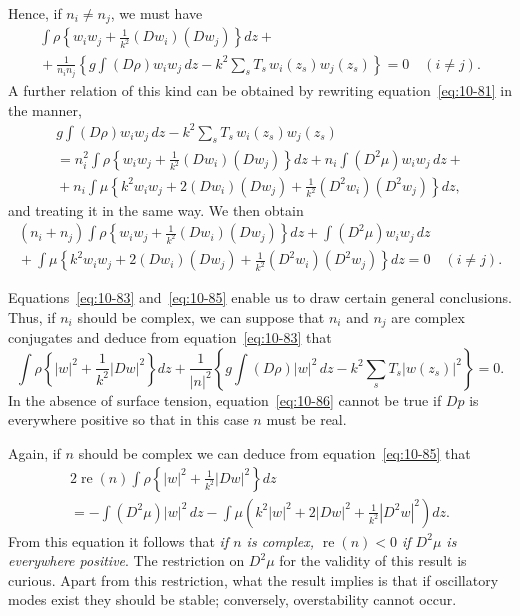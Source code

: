 Hence, if $n_i \neq n_j$, we must have
\begin{align}
\label{eq:10-83}
\int\rho\!\left\{w_iw_j+\frac{1}{k^2}(Dw_i)(Dw_j)\right\}\!dz + {} \nonumber\\
{} + \frac{1}{n_in_j}\!\left\{g\int(D\rho)w_iw_j\,dz - k^2\sum_s T_s\,w_i(z_s)w_j(z_s)\right\} = 0 \quad (i\neq j).
\end{align}
A further relation of this kind can be obtained by rewriting equation~\eqref{eq:10-81} in the manner,
\begin{align}
\label{eq:10-84}
g\int(D\rho)w_iw_j\,dz - k^2\sum_s T_s\,w_i(z_s)w_j(z_s) \nonumber\\
= n_i^2\int\rho\!\left\{w_iw_j+\frac{1}{k^2}(Dw_i)(Dw_j)\right\}\!dz + n_i\int(D^2\mu)w_iw_j\,dz + \nonumber\\
{} + n_i\int\mu\!\left\{k^2w_iw_j + 2(Dw_i)(Dw_j) + \frac{1}{k^2}(D^2w_i)(D^2w_j)\right\}\!dz,
\end{align}
and treating it in the same way. We then obtain
\begin{align}
\label{eq:10-85}
(n_i+n_j)\int\rho\!\left\{w_iw_j+\frac{1}{k^2}(Dw_i)(Dw_j)\right\}\!dz + \int(D^2\mu)w_iw_j\,dz \nonumber\\
{} + \int\mu\!\left\{k^2w_iw_j + 2(Dw_i)(Dw_j) + \frac{1}{k^2}(D^2w_i)(D^2w_j)\right\}\!dz = 0 \quad (i\neq j).
\end{align}

Equations~\eqref{eq:10-83} and~\eqref{eq:10-85} enable us to draw certain general conclusions. Thus, if $n_i$ should be complex, we can suppose that $n_i$ and $n_j$ are complex conjugates and deduce from equation~\eqref{eq:10-83} that
\begin{equation}
\label{eq:10-86}
\int\rho\!\left\{|w|^2+\frac{1}{k^2}|Dw|^2\right\}\!dz + \frac{1}{|n|^2}\!\left\{g\int(D\rho)|w|^2\,dz - k^2\sum_s T_s|w(z_s)|^2\right\} = 0.
\end{equation}
In the absence of surface tension, equation~\eqref{eq:10-86} cannot be true if $Dp$ is everywhere positive so that in this case $n$ must be real.

Again, if $n$ should be complex we can deduce from equation~\eqref{eq:10-85} that
\begin{align}
\label{eq:10-87}
2\operatorname{re}(n)\int\rho\!\left\{|w|^2+\frac{1}{k^2}|Dw|^2\right\}\!dz \nonumber\\
= -\int(D^2\mu)|w|^2\,dz - \int\mu\!\left(k^2|w|^2+2|Dw|^2+\frac{1}{k^2}|D^2w|^2\right)\!dz.
\end{align}
From this equation it follows that \emph{if $n$ is complex, $\operatorname{re}(n) < 0$ if $D^2\mu$ is everywhere positive}. The restriction on $D^2\mu$ for the validity of this result is curious. Apart from this restriction, what the result implies is that if oscillatory modes exist they should be stable; conversely, overstability cannot occur.

